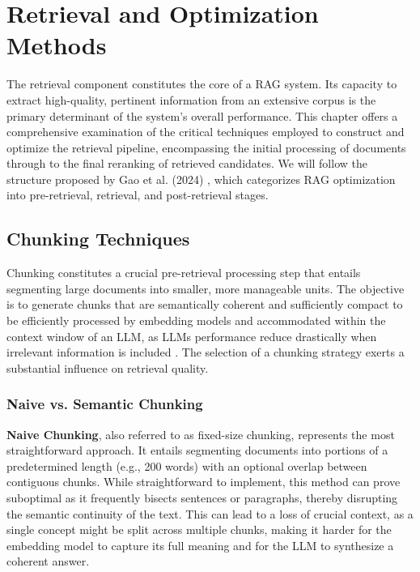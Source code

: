 \chapter{Retrieval and Optimization Methods}
\label{chap:retrieval_optimization}

The retrieval component constitutes the core of a RAG system. Its capacity to extract high-quality, pertinent information from an extensive corpus is the primary determinant of the system's overall performance. This chapter offers a comprehensive examination of the critical techniques employed to construct and optimize the retrieval pipeline, encompassing the initial processing of documents through to the final reranking of retrieved candidates. We will follow the structure proposed by Gao et al. (2024) \autocite{gao2024retrievalaugmentedgenerationlargelanguage}, which categorizes RAG optimization into pre-retrieval, retrieval, and post-retrieval stages.

\section{Chunking Techniques}
Chunking constitutes a crucial pre-retrieval processing step that entails segmenting large documents into smaller, more manageable units. The objective is to generate chunks that are semantically coherent and sufficiently compact to be efficiently processed by embedding models and accommodated within the context window of an LLM, as LLMs performance reduce drastically when irrelevant information is included \autocite{shi2023largelanguagemodelseasily}. The selection of a chunking strategy exerts a substantial influence on retrieval quality.

\subsection{Naive vs. Semantic Chunking}
\textbf{Naive Chunking}, also referred to as fixed-size chunking, represents the most straightforward approach. It entails segmenting documents into portions of a predetermined length (e.g., 200 words) with an optional overlap between contiguous chunks. While straightforward to implement, this method can prove suboptimal as it frequently bisects sentences or paragraphs, thereby disrupting the semantic continuity of the text. This can lead to a loss of crucial context, as a single concept might be split across multiple chunks, making it harder for the embedding model to capture its full meaning and for the LLM to synthesize a coherent answer.

